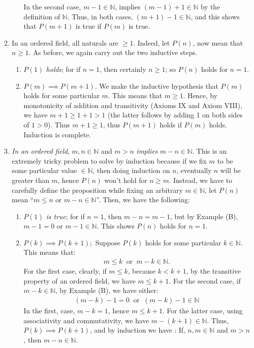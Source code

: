 \documentclass[12pt]{book}
\newcommand{\N}{\mathbb{N}}
\theoremstyle{definition}
\begin{document}
\begin{enumerate}[label=(\Alph*)]
\begin{enumerate}[label=(\roman*)]
				\indent In the second case, $m-1 \in \N$, implies $(m-1)+1 \in \N$ by the definition of $\N$. Thus, in both cases, $(m+1)-1 \in \N$, and this shows that $P(m+1)$ is true if $P(m)$ is true.   
		\end{enumerate}
	\item In an ordered field, all naturals are $\geq 1$. Indeed, let $P(n)$, now mean that $n\geq 1$. As before, we again carry out the two inductive steps. 
		\begin{enumerate}[label=(\roman*)]
			\item \textit{$P(1)$ holds}; for if $n=1$, then certainly $n\geq 1$; so $P(n)$ holds for $n=1$.
			\item $P(m) \implies P(m+1)$. We make the inductive hypothesis that $P(m)$ holds for some particular $m$. This means that $m\geq 1$. Hence, by monotonicity of addition and transitivity (Axioms IX and Axiom VIII), we have $m+1\geq 1+1 >1$ (the latter follows by adding 1 on both sides of $1>0$). Thus $m+1\geq 1$, thus $P(m+1)$ holds if $P(m)$ holds. Induction is complete.
		\end{enumerate}
	\item \textit{In an ordered field}, $m, n \in \N$ and $m>n$ \textit{implies} $m-n \in \N$. This is an extremely tricky problem to solve by induction because if we fix $m$ to be some particular value $\in \N$, then doing induction on $n$, eventually $n$ will be greater than $m$, hence $P(n)$ won't hold for $n \geq m$. Instead, we have to carefully define the proposition while fixing an arbitrary $m \in \N$, let $P(n)$ mean ``$m \leq n$ or $m-n \in \N$''. Then, we have the following:
		\begin{enumerate}[label=(\roman*)]
			\item \textit{$P(1)$ is true}; for if $n=1$, then $m-n =m -1$, but by Example (B), $m-1=0$ or $m-1 \in \N$. This shows $P(n)$ holds for $n=1$.
			\item $P(k)\implies P(k+1);$ Suppose $P(k)$ holds for some particular $k\in \N$. This means that:
				\begin{align*}
					m \leq k  \;\;\text{or}\;\; m-k \in \N.	
				\end{align*}
				For the first case, clearly, if $m\leq k$, because $k<k+1$, by the transitive property of an ordered field, we have $m\leq k+1$. For the second case, if $m-k\in\N$, by Example (B), we have either:
				\begin{align*}
					(m-k) -1=0\;\;\text{or}\;\; (m-k) -1 \in \N
				\end{align*}
				In the first, case, $m-k =1$, hence  $m\leq  k+1$. For the latter case, using associativity and commutativity, we have $m - (k+1) \in \N$. Thus, $P(k) \implies P(k+1)$, and by induction we have : If, $n,m \in \N$ and $m>n$, then $m-n \in \N$. 
 		\end{enumerate}
\end{enumerate}
\end{document}
